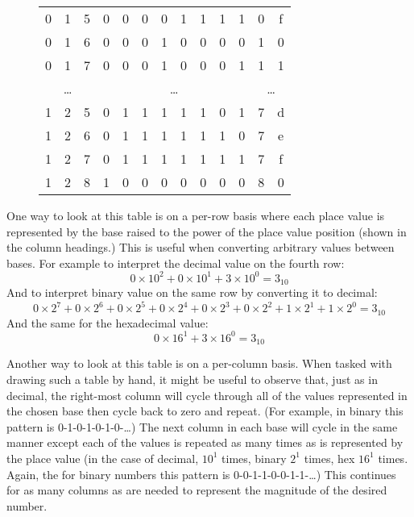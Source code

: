 \begin{figure}[ht]
\begin{center}
\begin{tabular}{|c|c|c||c|c|c|c|c|c|c|c||c|c|}
0		&	1		&	5		& 0 & 0 & 0 & 0 & 1 & 1 & 1 & 1		& 0 & f \\
0		&	1		&	6		& 0 & 0 & 0 & 1 & 0 & 0 & 0 & 0		& 1 & 0 \\
0		&	1		&	7		& 0 & 0 & 0 & 1 & 0 & 0 & 0 & 1		& 1 & 1 \\
\hline
\multicolumn{3}{|c||}{\ldots} & \multicolumn{8}{|c||}{\ldots} & \multicolumn{2}{|c|}{\ldots}\\
\hline
1       &   2       &   5		& 0 & 1 & 1 & 1 & 1 & 1 & 0 & 1		& 7 & d \\
1       &   2       &   6		& 0 & 1 & 1 & 1 & 1 & 1 & 1 & 0		& 7 & e \\
1       &   2       &   7		& 0 & 1 & 1 & 1 & 1 & 1 & 1 & 1		& 7 & f \\
1       &   2       &   8		& 1 & 0 & 0 & 0 & 0 & 0 & 0 & 0		& 8 & 0 \\
\hline
\end{tabular}
\end{center}
\label{Figure:integers}
\end{figure}


One way to look at this table is on a per-row basis where each place 
value is represented by the base raised to the power of the place value
position (shown in the column headings.)  This is useful when
converting arbitrary values between bases.  For example to interpret
the decimal value on the fourth row: 
\[ 0 \times 10^2 + 0 \times 10^1 + 3 \times 10^0 = 3_{10} \]
And to interpret binary value on the same row by converting it to decimal:
\[ 0 \times 2^7 + 0 \times 2^6 +0 \times 2^5 +0 \times 2^4 +0 \times 2^3 +0 \times 2^2 + 1 \times 2^1 + 1 \times 2^0 = 3_{10} \]
And the same for the hexadecimal value:
\[ 0 \times 16^1 + 3 \times 16^0 = 3_{10} \]


Another way to look at this table is on a per-column basis.  When
tasked with drawing such a table by hand, it might be useful 
to observe that, just as in decimal, the right-most column will
cycle through all of the values represented in the chosen base
then cycle back to zero and repeat.  (For example, in binary this
pattern is 0-1-0-1-0-1-0-\ldots) The next column in each base
will cycle in the same manner except each of the values is repeated
as many times as is represented by the place value (in the case of 
decimal, $10^1$ times, binary $2^1$ times, hex $16^1$ times.  Again,
the for binary numbers this pattern is  0-0-1-1-0-0-1-1-\ldots)
This continues for as many columns as are needed to represent the 
magnitude of the desired number.

